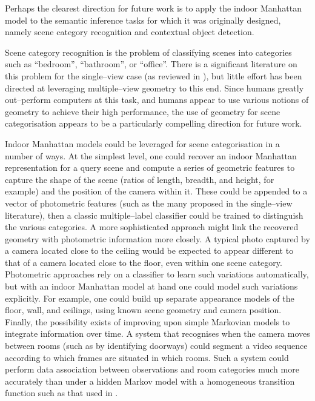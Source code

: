 Perhaps the clearest direction for future work is to apply the indoor
Manhattan model to the semantic inference tasks for which it was
originally designed, namely scene category recognition and contextual
object detection.

Scene category recognition is the problem of classifying scenes into
categories such as ``bedroom'', ``bathroom'', or ``office''. There is
a significant literature on this problem for the single--view case (as
reviewed in ), but little effort has been directed at
leveraging multiple--view geometry to this end. Since humans greatly
out--perform computers at this task, and humans appear to use various
notions of geometry to achieve their high performance, the use of
geometry for scene categorisation appears to be a particularly
compelling direction for future work.

Indoor Manhattan models could be leveraged for scene categorisation in
a number of ways. At the simplest level, one could recover an indoor
Manhattan representation for a query scene and compute a series of
geometric features to capture the shape of the scene (ratios of
length, breadth, and height, for example) and the position of the
camera within it. These could be appended to a vector of photometric
features (such as the many proposed in the single--view literature),
then a classic multiple--label classifier could be trained to
distinguish the various categories. A more sophisticated approach
might link the recovered geometry with photometric information more
closely. A typical photo captured by a camera located close to the
ceiling would be expected to appear different to that of a camera
located close to the floor, even within one scene
category. Photometric approaches rely on a classifier to learn such
variations automatically, but with an indoor Manhattan model at hand
one could model such variations explicitly. For example, one could
build up separate appearance models of the floor, wall, and ceilings,
using known scene geometry and camera position. Finally, the
possibility exists of improving upon simple Markovian models to
integrate information over time. A system that recognises when the
camera moves between rooms (such as by identifying doorways) could
segment a video sequence according to which frames are situated in
which rooms. Such a system could perform data association between
observations and room categories much more accurately than under a
hidden Markov model with a homogeneous transition function such as
that used in \cite{Torralba03}.

